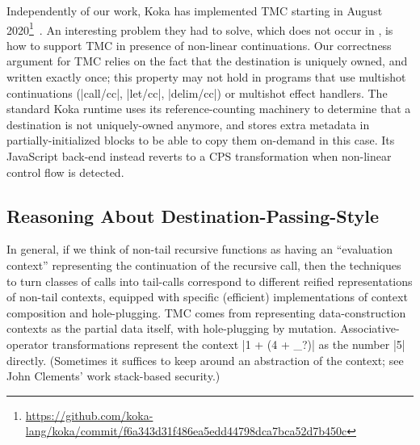 Independently of our work, Koka has implemented TMC starting in August
2020\footnote{\url{https://github.com/koka-lang/koka/commit/f6a343d31f486ea5edd44798dca7bca52d7b450c}}~\citep*{tmc-koka-2023}.
An interesting problem they had to solve, which does not occur in \OCaml,
is how to support TMC in presence of non-linear continuations. Our
correctness argument for TMC relies on the fact that the destination
is uniquely owned, and written exactly once; this property may not
hold in programs that use multishot continuations (\ocaml|call/cc|,
\ocaml|let/cc|, \ocaml|delim/cc|) or multishot effect handlers. The standard Koka runtime uses its
reference-counting machinery to determine that a destination is not
uniquely-owned anymore, and stores extra metadata in
partially-initialized blocks to be able to copy them on-demand in this
case. Its JavaScript back-end instead reverts to a CPS transformation
when non-linear control flow is detected.

\subsection{Reasoning About Destination-Passing-Style}

In general, if we think of non-tail recursive functions as having an ``evaluation context'' representing the continuation of the recursive call, then the techniques to turn classes of calls into tail-calls correspond to different reified representations of non-tail contexts, equipped with specific (efficient) implementations of context composition and hole-plugging.
TMC comes from representing data-construction contexts as the partial data itself, with hole-plugging by mutation.
Associative-operator transformations represent the context \ocaml|1 + (4 + _?)| as the number \ocaml|5| directly.
(Sometimes it suffices to keep around an abstraction of the context; see John Clements' work stack-based security.)

